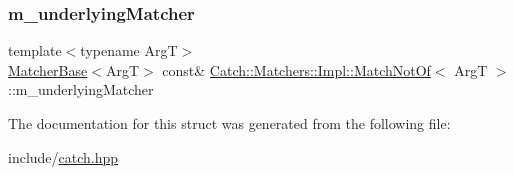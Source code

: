 \subsubsection{\texorpdfstring{m\+\_\+underlying\+Matcher}{m\_underlyingMatcher}}
{\footnotesize\ttfamily template$<$typename ArgT$>$ \\
\mbox{\hyperlink{struct_catch_1_1_matchers_1_1_impl_1_1_matcher_base}{Matcher\+Base}}$<$ArgT$>$ const\& \mbox{\hyperlink{struct_catch_1_1_matchers_1_1_impl_1_1_match_not_of}{Catch\+::\+Matchers\+::\+Impl\+::\+Match\+Not\+Of}}$<$ ArgT $>$\+::m\+\_\+underlying\+Matcher}



The documentation for this struct was generated from the following file\+:\begin{DoxyCompactItemize}
\item 
include/\mbox{\hyperlink{catch_8hpp}{catch.\+hpp}}\end{DoxyCompactItemize}
